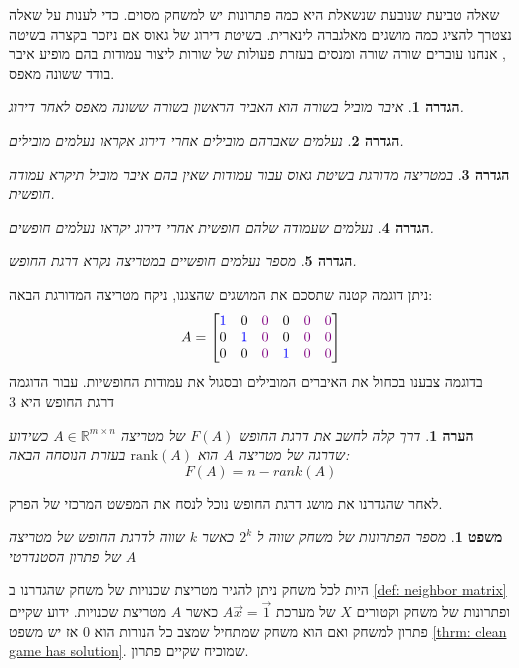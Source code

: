 \documentclass[12pt,leqno]{article}
\theoremstyle{theoremdd}
\newtheorem{definition}{הגדרה}
\newtheorem{theorem}{משפט}
\newtheorem{comm}{הערה}
\begin{document}
שאלה טביעת שנובעת שנשאלת היא כמה פתרונות יש למשחק מסוים.
כדי לענות על שאלה נצטרך להציג כמה מושגים מאלגברה לינארית.
בשיטת דירוג של גאוס אם ניזכר בקצרה בשיטה ,
אנחנו עוברים שורה שורה ומנסים בעזרת פעולות של שורות 
ליצור עמודות בהם מופיע איבר בודד ששונה מאפס.
\begin{definition}
    איבר מוביל בשורה הוא האביר הראשון בשורה ששונה מאפס 
    לאחר דירוג.
\end{definition}
\begin{definition}
    נעלמים שאברהם מובילים אחרי דירוג אקראו נעלמים מובילים.
\end{definition}
\begin{definition}
    במטריצה מדורגת בשיטת גאוס עבור עמודות שאין בהם איבר מוביל 
    תיקרא עמודה חופשית.
\end{definition}
\begin{definition}
    נעלמים שעמודה שלהם חופשית אחרי דירוג יקראו נעלמים חופשים.
\end{definition}
\begin{definition}
    מספר נעלמים חופשיים במטריצה נקרא
    דרגת החופש.
\end{definition}
ניתן דוגמה קטנה שתסכם את המושגים שהצגנו,
ניקח מטריצה  המדורגת הבאה:
\[
    A = \begin{bmatrix}
        {\color{blue}1} & 0 &  {\color{violet}0} & 0 &  {\color{violet}0} &  {\color{violet}0}\\
        0 &{\color{blue}1} & {\color{violet}0} & 0  &  {\color{violet}0} &  {\color{violet}0}\\
        0 & 0 &  {\color{violet}0} &{\color{blue}1} &  {\color{violet}0} &  {\color{violet}0}
    \end{bmatrix}
\]
בדוגמה צבענו בכחול את האיברים המובילים
ובסגול את עמודות החופשיות.
עבור הדוגמה דרגת החופש היא 3
\begin{comm}
    דרך קלה לחשב את דרגת החופש
    $F(A)$
    של מטריצה 
    $A \in\mathbb{R}^{m \times n}$
    כשידוע שדרגה של מטריצה
    $A$
    הוא 
    $\mathrm{rank}(A) $
    בעזרת הנוסחה הבאה:
    \[
        F(A) = n - rank(A)
    \]
\end{comm}
לאחר שהגדרנו את מושג דרגת החופש נוכל לנסח את המפשט המרכזי של הפרק.
\begin{theorem}
    מספר הפתרונות של משחק 
    שווה ל 
    $2^{k}$
    כאשר 
    $k$
    שווה לדרגת החופש של מטריצה
    $A$
    של פתרון הסטנדרטי
\end{theorem}
היות לכל משחק ניתן להגיר מטריצת שכנויות של משחק שהגדרנו 
ב
\ref{def: neighbor matrix}
ופתרונות של משחק וקטורים
$X$
של מערכת
$A \vec x = \vec{1}$
כאשר 
$A$
מטריצת שכנויות.
ידוע שקיים פתרון למשחק ואם הוא משחק שמתחיל שמצב כל הנורות הוא
$0$
אז יש משפט 
\ref{thrm: clean game has solution}.
שמוכיח שקיים פתרון.
\end{document}
